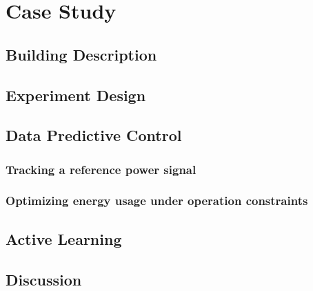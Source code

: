 \section{Case Study}
\label{S:casestudy}


\subsection{Building Description}

\subsection{Experiment Design}

\subsection{Data Predictive Control}


\subsubsection{Tracking a reference power signal}
\begin{figure}[!tb]
	\centering
	\missingfigure[figwidth=20pc]{}
	\caption{}
	\captionsetup{justification=centering}
	\label{F:MPC1}
\end{figure}

\subsubsection{Optimizing energy usage under operation constraints}
\begin{figure}[!tb]
	\centering
	\missingfigure[figwidth=20pc]{}
	\caption{}
	\captionsetup{justification=centering}
	\label{F:MPC2}
\end{figure}

\subsection{Active Learning}

\subsection{Discussion}

